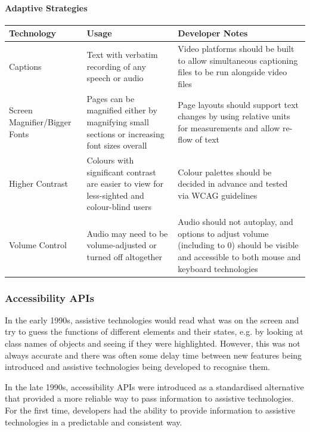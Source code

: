 \documentclass[ %
                    author={Aleena Baig},
                supervisor={Dr Simon Lock},
                    degree={BSc},
                     title={On Making Web Accessible Graphs},
                  subtitle={},
                      year={2019} ]{dissertation}
\begin{document}
\paragraph{Adaptive Strategies}

\begin{center}
\begin{longtable}{|p{3cm}|p{5cm}|p{5cm}|}
 \hline
 Technology & Usage & Developer Notes \\ [0.5ex]
 \hline \hline
 Captions & Text with verbatim recording of any speech or audio & Video platforms should be built to allow simultaneous captioning files to be run alongside video files \\
 \hline
 Screen Magnifier/Bigger Fonts & Pages can be magnified either by magnifying small sections or increasing font sizes overall & Page layouts should support text changes by using relative units for measurements and allow re-flow of text \\
 \hline
 Higher Contrast & Colours with significant contrast are easier to view for less-sighted and colour-blind users & Colour palettes should be decided in advance and tested via WCAG guidelines \\
 \hline
 Volume Control & Audio may need to be volume-adjusted or turned off altogether & Audio should not autoplay, and options to adjust volume (including to 0) should be visible and accessible to both mouse and keyboard technologies \\ [1ex]
 \hline
\end{longtable}
\end{center}

\subsubsection{Accessibility APIs}

In the early 1990s, assistive technologies would read what was on the screen and try to guess the functions of different elements and their states, e.g. by looking at class names of objects and seeing if they were highlighted. However, this was not always accurate and there was often some delay time between new features being introduced and assistive technologies being developed to recognise them.\cite{smashingAPIs}

In the late 1990s, accessibility APIs were introduced as a standardised alternative that provided a more reliable way to pass information to assistive technologies. For the first time, developers had the ability to provide information to assistive technologies in a predictable and consistent way.
\end{document}
